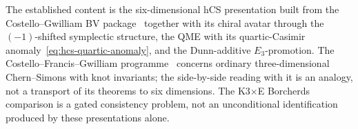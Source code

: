 The established content is the six-dimensional hCS
presentation built from the Costello--Gwilliam BV
package~\cite{CostelloRenormalization,CostelloGwilliam2017,CostelloGwilliam2021}
together
with its chiral avatar through the $(-1)$-shifted symplectic structure,
the QME with its quartic-Casimir anomaly~\eqref{eq:hcs-quartic-anomaly},
and the Dunn-additive $E_3$-promotion. The
Costello--Francis--Gwilliam programme~\cite{CFG2026} concerns ordinary
three-dimensional Chern--Simons with knot invariants; the side-by-side
reading with it is an analogy, not a transport of its theorems to six
dimensions. The K3$\times$E
Borcherds comparison is a gated consistency problem, not an unconditional
identification produced by these presentations alone.
